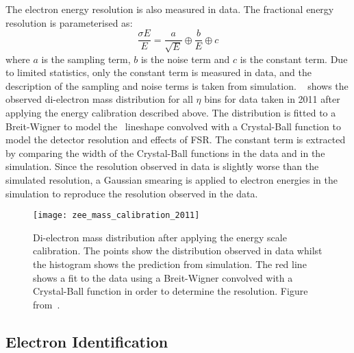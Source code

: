 The electron energy resolution is also measured in data. The fractional energy
resolution is parameterised as: 
\begin{equation}
\frac{\sigma E}{E} = \frac{a}{\sqrt{E}} \oplus \frac{b}{E} \oplus{c} 
\end{equation}
where $a$ is the sampling term, $b$ is the noise term and $c$ is the constant
term. Due to limited statistics, only the constant term is measured in data, and
the description of the sampling and noise terms is taken from simulation.
~ shows the observed di-electron mass distribution for
all $\eta$ bins for data taken in 2011 after applying the energy calibration
described above. The distribution is fitted to a Breit-Wigner to model the \Z\
lineshape convolved with a Crystal-Ball function to model the detector
resolution and effects of FSR. 
The constant term is extracted by comparing the width of
the Crystal-Ball functions in the data and in the simulation. Since the
resolution observed in data is slightly worse than the simulated resolution, a
Gaussian smearing is applied to electron energies in the simulation to reproduce
the resolution observed in the data.

\begin{figure}[h]
\centering
            \texttt{[image: zee\_mass\_calibration\_2011]}
\caption[Di-electron mass distribution after applying the
energy scale calibration.]{Di-electron mass distribution after applying the
energy scale calibration. The points show the distribution observed in data
whilst the histogram shows the prediction from simulation. The red line shows a
fit to the data 
using a Breit-Wigner convolved with a
Crystal-Ball function in order to determine the resolution. Figure from~\cite{ElectronZee2011}.}
\label{fig:el-energy-calib-2011}
\end{figure}

\subsection{Electron Identification}
\label{sec:reco-el-id}

